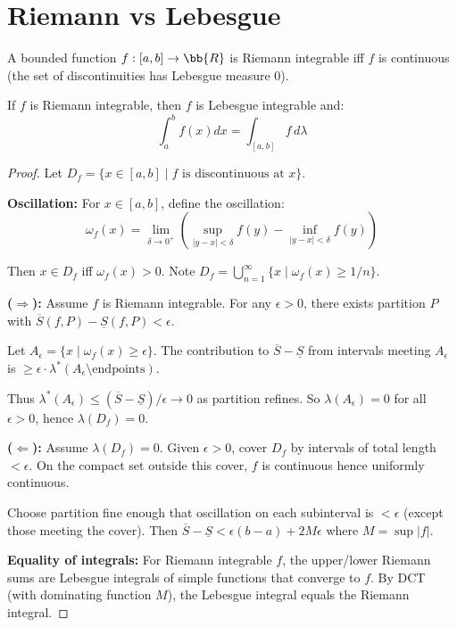 \section{Riemann vs Lebesgue}

\begin{theorem}
A bounded function $f: [a, b] \to \bb{R}$ is Riemann integrable iff $f$ is continuous \almosteverywhere{} (the set of discontinuities has Lebesgue measure 0).

If $f$ is Riemann integrable, then $f$ is Lebesgue integrable and:
\[ \int_a^b f(x) dx = \int_{[a,b]} f \, d\lambda \]
\end{theorem}

\begin{proof}
Let $D_f = \{x \in [a,b] \mid f \text{ is discontinuous at } x\}$.

\textbf{Oscillation:} For $x \in [a,b]$, define the oscillation:
\[ \omega_f(x) = \lim_{\delta \to 0^+} \left( \sup_{|y-x|<\delta} f(y) - \inf_{|y-x|<\delta} f(y) \right) \]

Then $x \in D_f$ iff $\omega_f(x) > 0$. Note $D_f = \bigcup_{n=1}^\infty \{x \mid \omega_f(x) \geq 1/n\}$.

\textbf{($\Rightarrow$):} Assume $f$ is Riemann integrable. For any $\epsilon > 0$, there exists partition $P$ with $\overline{S}(f,P) - \underline{S}(f,P) < \epsilon$.

Let $A_\epsilon = \{x \mid \omega_f(x) \geq \epsilon\}$. The contribution to $\overline{S} - \underline{S}$ from intervals meeting $A_\epsilon$ is $\geq \epsilon \cdot \lambda^*(A_\epsilon \setminus \text{endpoints})$.

Thus $\lambda^*(A_\epsilon) \leq (\overline{S} - \underline{S})/\epsilon \to 0$ as partition refines. So $\lambda(A_\epsilon) = 0$ for all $\epsilon > 0$, hence $\lambda(D_f) = 0$.

\textbf{($\Leftarrow$):} Assume $\lambda(D_f) = 0$. Given $\epsilon > 0$, cover $D_f$ by intervals of total length $< \epsilon$. On the compact set outside this cover, $f$ is continuous hence uniformly continuous.

Choose partition fine enough that oscillation on each subinterval is $< \epsilon$ (except those meeting the cover). Then $\overline{S} - \underline{S} < \epsilon(b-a) + 2M\epsilon$ where $M = \sup|f|$.

\textbf{Equality of integrals:} For Riemann integrable $f$, the upper/lower Riemann sums are Lebesgue integrals of simple functions that converge \almosteverywhere{} to $f$. By DCT (with dominating function $M$), the Lebesgue integral equals the Riemann integral.
\end{proof}


